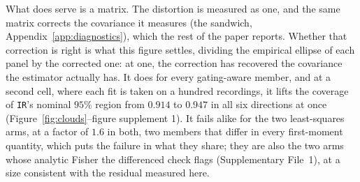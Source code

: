 What does serve is a matrix. The distortion is measured as one, and the same matrix corrects the
covariance it measures (the sandwich, Appendix~\ref{app:diagnostics}), which the rest of
the paper reports. Whether that correction is right is what this figure settles, dividing the
empirical ellipse of each panel by the corrected one: at one, the correction has recovered the
covariance the estimator actually has. It does for every gating-aware member, and at a second cell,
where each fit is taken on a hundred recordings, it lifts the coverage of \texttt{IR}'s nominal
$95\%$ region from $0.914$ to $0.947$ in all six
directions at once (Figure~\ref{fig:clouds}--figure supplement 1).
It fails alike for the two least-squares arms, at a factor of $1.6$ in both, two members that differ
in every first-moment quantity, which puts the failure in what they share; they are also the two
arms whose analytic Fisher the differenced check flags (Supplementary File~1), at a size consistent
with the residual measured here.

